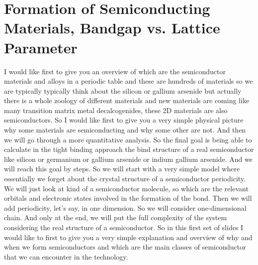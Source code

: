 \section{Formation of Semiconducting Materials, Bandgap vs. Lattice Parameter}
I would like first to give you an overview of which are the semiconductor materials and alloys in a periodic table and these are hundreds of materials so we are typically typically think about the silicon or gallium arsenide but actually there is a whole zoology of different materials and new materials are coming like many transition matrix metal decalcogenides, these 2D materials are also semiconductors. So I would like first to give you a very simple physical picture why some materials are semiconducting and why some other are not. And then we will go through a more quantitative analysis. So the final goal is being able to calculate in the tight binding approach the bind structure of a real semiconductor like silicon or germanium or gallium arsenide or indium gallium arsenide. And we will reach this goal by steps. So we will start with a very simple model where essentially we forget about the crystal structure of a semiconductor periodicity. We will just look at kind of a semiconductor molecule, so which are the relevant orbitals and electronic states involved in the formation of the bond. Then we will add periodicity, let's say, in one dimension. So we will consider one-dimensional chain. And only at the end, we will put the full complexity of the system considering the real structure of a semiconductor. So in this first set of slides I would like to first to give you a very simple explanation and overview of why and when we form semiconductors and which are the main classes of semiconductor that we can encounter in the technology.\\
